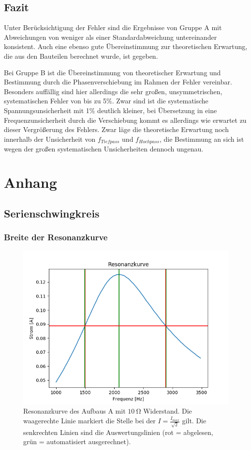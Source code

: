 \documentclass[12pt,a4paper]{article}
\begin{document}
\subsection{Fazit}
Unter Berücksichtigung der Fehler sind die Ergebnisse von Gruppe A mit Abweichungen von weniger als einer Standardabweichung untereinander konsistent. Auch eine ebenso gute Übereinstimmung zur theoretischen Erwartung, die aus den Bauteilen berechnet wurde, ist gegeben.

Bei Gruppe B ist die Übereinstimmung von theoretischer Erwartung und Bestimmung durch die Phasenverschiebung im Rahmen der Fehler vereinbar. Besonders auffällig sind hier allerdings die sehr großen, unsymmetrischen, systematischen Fehler von bis zu 5\%. Zwar sind ist die systematische Spannungsunsicherheit mit 1\% deutlich kleiner, bei Übersetzung in eine Frequenzunsicherheit durch die Verschiebung kommt es allerdings wie erwartet zu dieser Vergrößerung des Fehlers. Zwar läge die theoretische Erwartung noch innerhalb der Unsicherheit von $f_{Tiefpass}$ und $f_{Hochpass}$, die Bestimmung an sich ist wegen der großen systematischen Unsicherheiten dennoch ungenau.


\newpage
\section{Anhang}

\subsection{Serienschwingkreis}
\subsubsection{Breite der Resonanzkurve}
\begin{figure}[H]
	\centering
	\includegraphics[scale=0.7]{Bilder/Serie_Resonanzkurve_A_10.png}
	\caption{Resonanzkurve des Aufbaus A mit $\SI{10}{\ohm}$ Widerstand. Die waagerechte Linie markiert die Stelle bei der $I = \frac{I_{max}}{\sqrt{2}}$ gilt. Die senkrechten Linien sind die Auswertungslinien (rot = abgelesen, grün = automatisiert ausgerechnet).}
	\label{fig:Serie_Resonanzkurve_A_10}
\end{figure}
\end{document}
